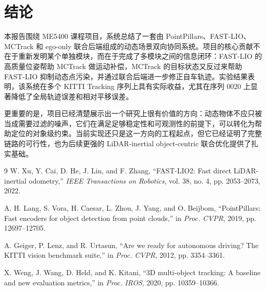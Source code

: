 \documentclass[UTF8,a4paper,12pt]{ctexart}
\begin{document}
\section{结论}
本报告围绕 ME5400 课程项目，系统总结了一套由 PointPillars、FAST-LIO、MCTrack 和 ego-only 联合后端组成的动态场景双向协同系统。项目的核心贡献不在于重新发明某个单独模块，而在于完成了多模块之间的信息闭环：FAST-LIO 的高质量位姿帮助 MCTrack 做运动补偿，MCTrack 的目标状态又反过来帮助 FAST-LIO 抑制动态点污染，并通过联合后端进一步修正自车轨迹。实验结果表明，该系统在多个 KITTI Tracking 序列上具有实际收益，尤其在序列 0020 上显著降低了全局轨迹误差和相对平移误差。

更重要的是，项目已经清楚展示出一个研究上很有价值的方向：动态物体不应只被当成需要过滤的噪声，它们在满足足够稳定性和可观测性的前提下，可以转化为帮助定位的对象级约束。当前实现还只是这一方向的工程起点，但它已经证明了完整链路的可行性，也为后续更强的 LiDAR-inertial object-centric 联合优化提供了扎实基础。

\begin{thebibliography}{9}
W. Xu, Y. Cai, D. He, J. Lin, and F. Zhang, ``FAST-LIO2: Fast direct LiDAR-inertial odometry,'' \emph{IEEE Transactions on Robotics}, vol. 38, no. 4, pp. 2053--2073, 2022.

A. H. Lang, S. Vora, H. Caesar, L. Zhou, J. Yang, and O. Beijbom, ``PointPillars: Fast encoders for object detection from point clouds,'' in \emph{Proc. CVPR}, 2019, pp. 12697--12705.

A. Geiger, P. Lenz, and R. Urtasun, ``Are we ready for autonomous driving? The KITTI vision benchmark suite,'' in \emph{Proc. CVPR}, 2012, pp. 3354--3361.

X. Weng, J. Wang, D. Held, and K. Kitani, ``3D multi-object tracking: A baseline and new evaluation metrics,'' in \emph{Proc. IROS}, 2020, pp. 10359--10366.
\end{thebibliography}
\end{document}
